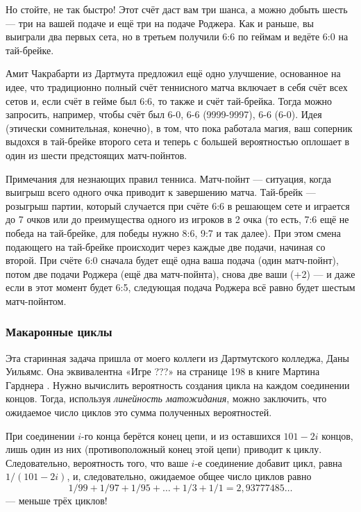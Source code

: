 Но стойте, не так быстро!
Этот счёт даст вам три шанса, а можно добыть шесть --- три на вашей подаче и ещё три на подаче Роджера.
Как и раньше, вы выиграли два первых сета, но в третьем получили 6:6 по геймам и ведёте 6:0 на тай-брейке.

Амит Чакрабарти из Дартмута предложил ещё одно улучшение, основанное на идее, что традиционно полный счёт теннисного матча включает в себя счёт всех сетов и, если счёт в гейме был 6:6, то также и счёт тай-брейка.
Тогда можно запросить, например, чтобы счёт был 6-0, 6-6 (9999-9997), 6-6 (6-0).
Идея (этически сомнительная, конечно), в том, что пока работала магия, ваш соперник выдохся в тай-брейке второго сета и теперь с большей вероятностью оплошает в один из шести предстоящих матч-пойнтов.

\begin{addedbytheeditors}
Примечания для незнающих правил тенниса.
Матч-пойнт --- ситуация, когда выигрыш всего одного очка приводит к завершению матча.
Тай-брейк --- розыгрыш партии, который
случается при счёте 6:6 в решающем сете и играется до 7 очков или до
преимущества
одного из игроков в 2 очка (то есть, 7:6 ещё не победа на тай-брейке, для победы нужно 8:6, 9:7 и так далее).
При этом смена подающего на тай-брейке происходит через каждые две подачи, начиная со второй.
При счёте 6:0 сначала будет ещё одна ваша подача (один матч-пойнт), потом две подачи Роджера (ещё два матч-пойнта), снова две ваши (+2) --- и даже если в этот момент будет 6:5, следующая подача Роджера всё равно будет шестым матч-пойнтом.
\end{addedbytheeditors}

\subsubsection*{Макаронные циклы}

Эта старинная задача пришла от моего коллеги из Дартмутского колледжа, Даны Уильямс.
Она эквивалентна «Игре ???» на странице 198 в книге Мартина Гарднера \cite{26}.
Нужно вычислить вероятность создания цикла на каждом соединении концов.
Тогда, используя \emph{линейность матожидания}, можно заключить, что ожидаемое число циклов это сумма полученных вероятностей.

При соединении $i$-го конца берётся конец цепи, и из оставшихся $101 - 2i$ концов, лишь один из них (противоположный конец этой цепи) приводит к циклу.
Следовательно, вероятность того, что ваше $i$-е соединение добавит цикл, равна $1/(101 - 2i)$, и, следовательно, ожидаемое общее число циклов равно 
\[1/99 + 1/97 + 1/95 +\dots + 1/3 + 1/1 = 2{,}93777485\dots\]
--- меньше трёх циклов!


